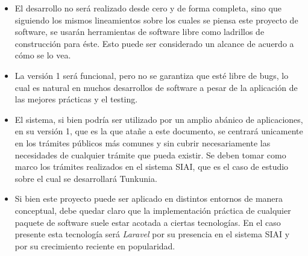 \begin{itemize}
    \item El desarrollo no será realizado desde cero y de forma completa, sino que siguiendo los mismos lineamientos sobre los cuales se piensa este proyecto de software, se usarán herramientas de software libre como ladrillos de construcción para éste. Esto puede ser considerado un alcance de acuerdo a cómo se lo vea.
    \item La versión 1 será funcional, pero no se garantiza que esté libre de bugs, lo cual es natural en muchos desarrollos de software a pesar de la aplicación de las mejores prácticas y el testing.
    \item El sistema, si bien podría ser utilizado por un amplio abánico de aplicaciones, en su versión 1, que es la que atañe a este documento, se centrará unicamente en los trámites públicos más comunes y sin cubrir necesariamente las necesidades de cualquier trámite que pueda existir. Se deben tomar como marco los trámites realizados en el sistema SIAI, que es el caso de estudio sobre el cual se desarrollará Tunkunia.
    \item Si bien este proyecto puede ser aplicado en distintos entornos de manera conceptual, debe quedar claro que la implementación práctica de cualquier paquete de software suele estar acotada a ciertas tecnologías. En el caso presente esta tecnología será \textit{Laravel} por su presencia en el sistema SIAI y por su crecimiento reciente en popularidad.
\end{itemize}